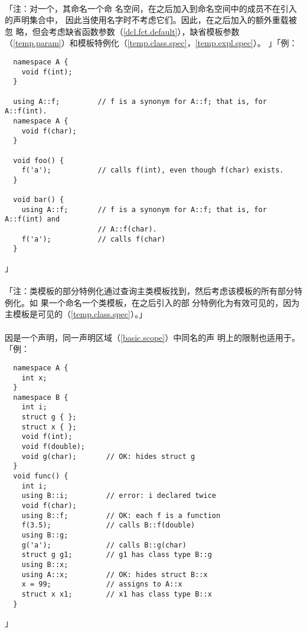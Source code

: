 \paragraph{}
「注：对一个，其命名一个命
名空间，在之后加入到命名空间中的成员不在引入的声明集合中，
因此当使用名字时不考虑它们。因此，在之后加入的额外重载被忽
略，但会考虑缺省函数参数（\ref{dcl.fct.default}），缺省模板参数
（\ref{temp.param}）和模板特例化（\ref{temp.class.spec}，\ref{temp.expl.spec}）。
」「例：
\begin{lstlisting}
  namespace A {
    void f(int);
  }

  using A::f;         // f is a synonym for A::f; that is, for A::f(int).
  namespace A {
    void f(char);
  }

  void foo() {
    f('a');           // calls f(int), even though f(char) exists.
  }

  void bar() {
    using A::f;       // f is a synonym for A::f; that is, for A::f(int) and
                      // A::f(char).
    f('a');           // calls f(char)
  }
\end{lstlisting}」

\paragraph{}
「注：类模板的部分特例化通过查询主类模板找到，然后考虑该模板的所有部分特例化。如
果一个命名一个类模板，在之后引入的部
分特例化为有效可见的，因为主模板是可见的（\ref{temp.class.spec}）。」

\paragraph{}
因是一个声明，同一声明区域（\ref{basic.scope}）中同名的声
明上的限制也适用于。「例：
\begin{lstlisting}
  namespace A {
    int x;
  }
  namespace B {
    int i;
    struct g { };
    struct x { };
    void f(int);
    void f(double);
    void g(char);       // OK: hides struct g
  }
  void func() {
    int i;
    using B::i;         // error: i declared twice
    void f(char);
    using B::f;         // OK: each f is a function
    f(3.5);             // calls B::f(double)
    using B::g;
    g('a');             // calls B::g(char)
    struct g g1;        // g1 has class type B::g
    using B::x;
    using A::x;         // OK: hides struct B::x
    x = 99;             // assigns to A::x
    struct x x1;        // x1 has class type B::x
  }
\end{lstlisting}」

